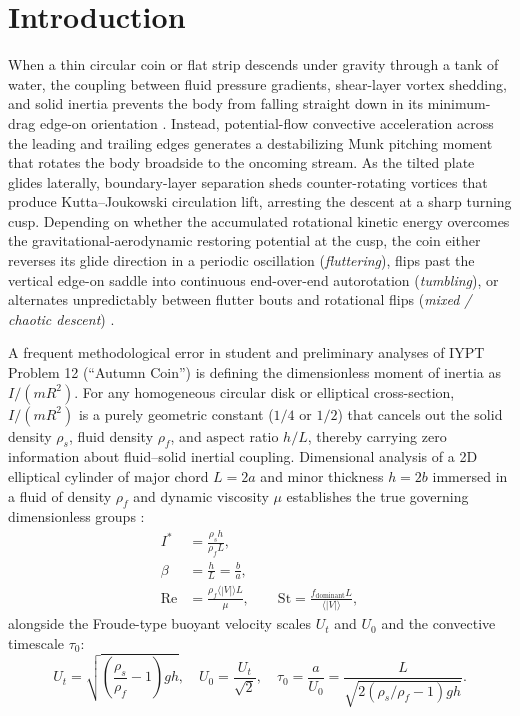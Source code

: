 \documentclass[10pt,a4paper,twocolumn]{article}
\begin{document}
\section{Introduction}
When a thin circular coin or flat strip descends under gravity through a tank of water, the coupling between fluid pressure gradients, shear-layer vortex shedding, and solid inertia prevents the body from falling straight down in its minimum-drag edge-on orientation \cite{Field1997,Belmonte1998,Pesavento2004,Andersen2005a}. Instead, potential-flow convective acceleration across the leading and trailing edges generates a destabilizing Munk pitching moment that rotates the body broadside to the oncoming stream. As the tilted plate glides laterally, boundary-layer separation sheds counter-rotating vortices that produce Kutta--Joukowski circulation lift, arresting the descent at a sharp turning cusp. Depending on whether the accumulated rotational kinetic energy overcomes the gravitational-aerodynamic restoring potential at the cusp, the coin either reverses its glide direction in a periodic oscillation (\textit{fluttering}), flips past the vertical edge-on saddle into continuous end-over-end autorotation (\textit{tumbling}), or alternates unpredictably between flutter bouts and rotational flips (\textit{mixed / chaotic descent}) \cite{Andersen2005b}.

A frequent methodological error in student and preliminary analyses of IYPT Problem 12 (``Autumn Coin'') is defining the dimensionless moment of inertia as $I / (m R^2)$. For any homogeneous circular disk or elliptical cross-section, $I / (m R^2)$ is a purely geometric constant ($1/4$ or $1/2$) that cancels out the solid density $\rho_s$, fluid density $\rho_f$, and aspect ratio $h/L$, thereby carrying zero information about fluid--solid inertial coupling. Dimensional analysis of a 2D elliptical cylinder of major chord $L = 2a$ and minor thickness $h = 2b$ immersed in a fluid of density $\rho_f$ and dynamic viscosity $\mu$ establishes the true governing dimensionless groups \cite{Andersen2005a,Andersen2005b}:
\begin{align}
    I^* &= \frac{\rho_s h}{\rho_f L}, \label{eq:istar} \\
    \beta &= \frac{h}{L} = \frac{b}{a}, \label{eq:beta} \\
    \mathrm{Re} &= \frac{\rho_f \langle |V| \rangle L}{\mu}, \qquad \mathrm{St} = \frac{f_{\mathrm{dominant}} L}{\langle |V| \rangle}, \label{eq:re_st}
\end{align}
 alongside the Froude-type buoyant velocity scales $U_t$ and $U_0$ and the convective timescale $\tau_0$:
\begin{equation}
    U_t = \sqrt{\left(\frac{\rho_s}{\rho_f} - 1\right) g h}, \quad U_0 = \frac{U_t}{\sqrt{2}}, \quad \tau_0 = \frac{a}{U_0} = \frac{L}{\sqrt{2(\rho_s/\rho_f - 1)gh}}. \label{eq:scales}
\end{equation}
\end{document}
